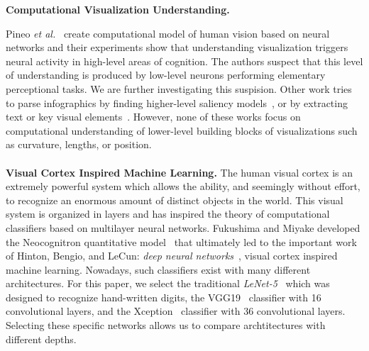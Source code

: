 \textbf{Computational Visualization Understanding.}

Pineo \textit{et al.}~\cite{Pineo2012_computational_perception} create computational model of human vision based on neural networks and their experiments show that understanding visualization triggers neural activity in high-level areas of cognition. The authors suspect that this level of understanding is produced by low-level neurons performing elementary perceptional tasks. We are further investigating this suspision.
Other work tries to parse infographics by finding higher-level saliency models~\cite{bylinskii2016should}, or by extracting text or key visual elements~\cite{diagram_understanding,kembhavi2016diagram,zoya_text_visual_tags}. However, none of these works focus on computational understanding of lower-level building blocks of visualizations such as curvature, lengths, or position.
\\~\\
\textbf{Visual Cortex Inspired Machine Learning.} 
The human visual cortex is an extremely powerful system which allows the ability, and seemingly without effort, to recognize an enormous amount of distinct objects in the world. This visual system is organized in layers and has inspired the theory of computational classifiers based on multilayer neural networks. Fukushima and Miyake developed the Neocognitron quantitative model~\cite{fukushima1982neocognitron} that ultimately led to the important work of Hinton, Bengio, and LeCun: \textit{deep neural networks}~\cite{lecun2015deep}, visual cortex inspired machine learning.
Nowadays, such classifiers exist with many different architectures. For this paper, we select the traditional \emph{LeNet-5}~\cite{lenet} which was designed to recognize hand-written digits, the VGG19~\cite{simonyan_very_deep2014} classifier with 16 convolutional layers, and the Xception~\cite{xception} classifier with 36 convolutional layers. Selecting these specific networks allows us to compare archtitectures with different depths.


